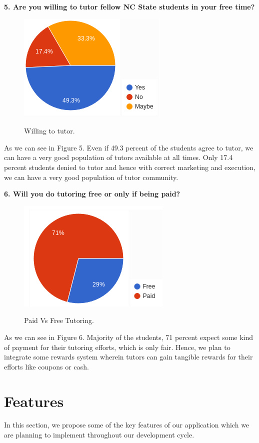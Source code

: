 \documentclass{sig-alternate-05-2015}
\begin{document}
\textbf {5. Are you willing to tutor fellow NC State students in your free time?}
\begin{figure}[h!t]
\centering
\includegraphics{Q5SE}
\label{Q5SE}
\caption{Willing to tutor.}
\end{figure}

As we can see in Figure 5. Even if 49.3 percent of the students agree to tutor, we can have a very good population of tutors available at all times. Only 17.4 percent students denied to tutor and hence with correct marketing and execution, we can have a very good population of tutor community.

\textbf {6. Will you do tutoring free or only if being paid?}
\begin{figure}[htb]
\centering
\includegraphics{Q6SE}
\label{Q6SE}
\caption{Paid Vs Free Tutoring.}
\end{figure}
As we can see in Figure 6. Majority of the students, 71 percent expect some kind of payment for their tutoring efforts, which is only fair. Hence, we plan to integrate some rewards system wherein tutors can gain tangible rewards for their efforts like coupons or cash.

\section{Features}
In this section, we propose some of the key features of our application which we are planning to implement throughout our development cycle.
\end{document}
